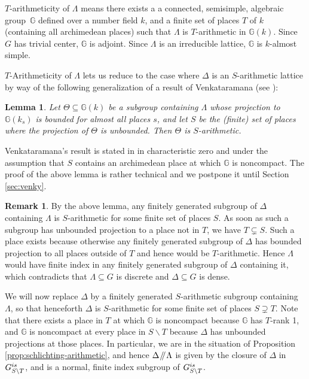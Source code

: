 \documentclass[11pt]{article}
\numberwithin{equation}{section}\providecommand{\llangle}{\langle\!\langle}\providecommand{\rrangle}{\rangle\!\rangle}\providecommand{\Asterisk}{\ast}
\let\bs\backslash
\newcommand{\sslash}{\mathbin{\mkern-3mu /\mkern-5mu/ \mkern-3mu}}
\newcommand{\bbG}{\ensuremath{\mathbb{G}}}
\newtheorem{lemma}[thm]{Lemma}
\theoremstyle{definition}
\newtheorem{rem}[thm]{Remark}
\begin{document}
$T$-arithmeticity of $\Lambda$ means there exists a a connected, semisimple, algebraic group~$\bbG$ defined over a number field $k$, and a finite set of places $T$ of $k$ (containing all archimedean places) such that $\Lambda$ is $T$-arithmetic in $\bbG(k)$. Since $G$ has trivial center, $\bbG$ is adjoint. Since $\Lambda$ is an irreducible lattice, $\bbG$ is $k$-almost simple.

$T$-Arithmeticity of $\Lambda$ lets us reduce to the case where $\Delta$ is an $S$-arithmetic lattice by way of the following generalization of a result of Venkataramana (see \cite[Prop.\,2.3]{lubotzky-zimmer}):
\begin{lemma}\label{lem:gen-venky}
Let $\Theta\subseteq \bbG(k)$ be a subgroup containing $\Lambda$ whose projection to $\bbG(k_s)$ is bounded for almost all places $s$, and let $S$ be the (finite) set of places where the projection of $\Theta$ is unbounded. Then $\Theta$ is $S$-arithmetic.
\end{lemma}
Venkataramana's result is stated in \cite{lubotzky-zimmer} in characteristic zero and under the assumption that $S$ contains an archimedean place at which $\bbG$ is noncompact. The proof of the above lemma is rather technical and we postpone it until Section \ref{sec:venky}.

\begin{rem}\label{rem:one-prime}
By the above lemma, any finitely generated subgroup of $\Delta$ containing $\Lambda$ is $S$-arithmetic for some finite set of places $S$. As soon as such a subgroup has unbounded projection to a place not in $T$, we have $T\subsetneq S$. Such a place exists because otherwise any finitely generated subgroup of $\Delta$ has bounded projection to all places outside of $T$ and hence would be $T$-arithmetic. Hence $\Lambda$ would have finite index in any finitely generated subgroup of $\Delta$ containing it, which contradicts that $\Lambda\subseteq G$ is discrete and $\Delta\subseteq G$ is dense.

We will now replace $\Delta$ by a finitely generated $S$-arithmetic subgroup containing~$\Lambda$, so that henceforth $\Delta$ is $S$-arithmetic for some finite set of places $S\supsetneq T$. Note that there exists a place in $T$ at which $\bbG$ is noncompact because $\bbG$ has $T$-rank 1, and $\bbG$ is noncompact at every place in $S\bs T$ because $\Delta$ has unbounded projections at those places. In particular, we are in the situation of Proposition \ref{prop:schlichting-arithmetic}, and hence $\Delta\sslash\Lambda$ is given by the closure of $\Delta$ in $G_{S\bs T}^{\textup{is}}$, and is a normal, finite index subgroup of $G_{S\bs T}^{\textup{is}}$.
\end{rem}
\end{document}
